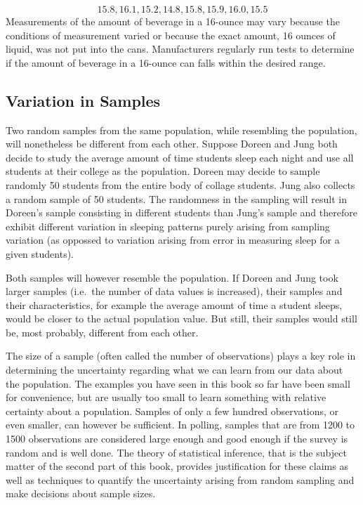 \documentclass[
]{krantz}
\theoremstyle{definition}
\theoremstyle{definition}
\theoremstyle{definition}
\theoremstyle{remark}
\begin{document}
\[15.8,16.1,15.2,14.8,15.8,15.9,16.0,15.5\]
Measurements of the amount of beverage in a 16-ounce may vary because the conditions of measurement varied or because the exact amount, 16 ounces of liquid, was not put into the cans. Manufacturers regularly run tests to determine if the amount of beverage in a 16-ounce can falls within the desired range.

\hypertarget{variation-in-samples}{%
\subsection{Variation in Samples}\label{variation-in-samples}}

Two random samples from the same population, while resembling the population, will nonetheless be different from each other. Suppose Doreen and Jung both decide to study the average amount of time students sleep each night and use all students at their college as the population. Doreen may decide to sample randomly 50 students from the entire body of collage students. Jung also collects a random sample of 50 students. The randomness in the sampling will result in Doreen's sample consisting in different students than Jung's sample and therefore exhibit different variation in sleeping patterns purely arising from sampling variation (as oppossed to variation arising from error in measuring sleep for a given students).

Both samples will however resemble the population. If Doreen and Jung took larger samples (i.e.~the number of data values is increased), their samples and their characteristics, for example the average amount of time a student sleeps, would be closer to the actual population value. But still, their samples would still be, most probably, different from each other.

The size of a sample (often called the number of observations) plays a key role in determining the uncertainty regarding what we can learn from our data about the population. The examples you have seen in this book so far have been small for convenience, but are usually too small to learn something with relative certainty about a population. Samples of only a few hundred observations, or even smaller, can however be sufficient. In polling, samples that are from 1200 to 1500 observations are considered large enough and good enough if the survey is random and is well done. The theory of statistical inference, that is the subject matter of the second part of this book, provides justification for these claims as well as techniques to quantify the uncertainty arising from random sampling and make decisions about sample sizes.
\end{document}

